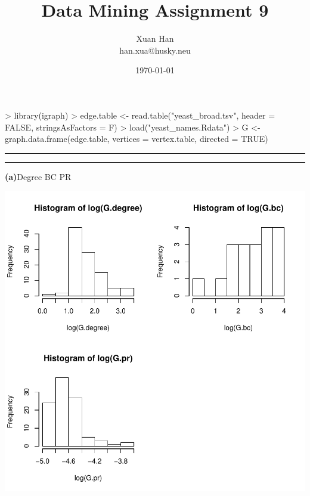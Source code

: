 \documentclass[a4paper]{article}
\makeatletter
\newcommand{\question}[2] {\vspace{.25in} \hrule\vspace{0.5em}
\noindent{\bf #1: #2} \vspace{0.5em}
\hrule \vspace{.10in}}
\renewcommand{\part}[1] {\vspace{.10in} {\bf (#1)}}
\newcommand{\myname}{Xuan Han}
\newcommand{\myhusky}{han.xua@husky.neu}
\newcommand{\myhwnum}{9}
\makeatother
\begin{document}


\title{Data Mining Assignment \myhwnum}
\author{\myname \\
        \myhusky}
\date{\today}
\maketitle

\thispagestyle{plain}

\begin{Schunk}
\begin{Sinput}
> library(igraph)
> edge.table <- read.table("yeast_broad.tsv", header = FALSE, stringsAsFactors = F)
> load("yeast_names.Rdata")
> G <- graph.data.frame(edge.table, vertices = vertex.table, directed = TRUE)
\end{Sinput}
\end{Schunk}


\question{1}{Yeast}
\part{a}{Degree BC PR}
\begin{Schunk}
\end{Schunk}
\includegraphics{graph-1a}
\end{document}
